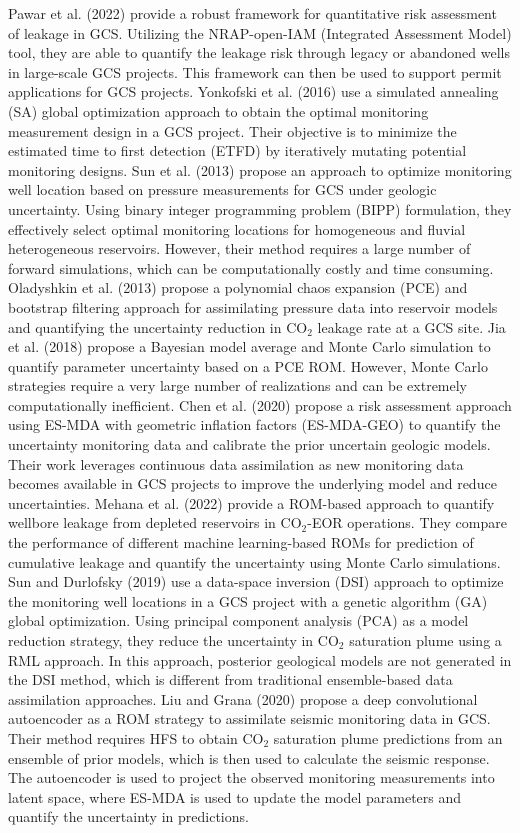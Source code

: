 \documentclass[10pt, twoside]{article}
\begin{document}
Pawar et al. (2022) provide a robust framework for quantitative risk assessment of leakage in GCS. Utilizing the NRAP-open-IAM (Integrated Assessment Model) tool, they are able to quantify the leakage risk through legacy or abandoned wells in large-scale GCS projects. This framework can then be used to support permit applications for GCS projects. Yonkofski et al. (2016) use a simulated annealing (SA) global optimization approach to obtain the optimal monitoring measurement design in a GCS project. Their objective is to minimize the estimated time to first detection (ETFD) by iteratively mutating potential monitoring designs. Sun et al. (2013) propose an approach to optimize monitoring well location based on pressure measurements for GCS under geologic uncertainty. Using binary integer programming problem (BIPP) formulation, they effectively select optimal monitoring locations for homogeneous and fluvial heterogeneous reservoirs. However, their method requires a large number of forward simulations, which can be computationally costly and time consuming. Oladyshkin et al. (2013) propose a polynomial chaos expansion (PCE) and bootstrap filtering approach for assimilating pressure data into reservoir models and quantifying the uncertainty reduction in CO$_2$ leakage rate at a GCS site. Jia et al. (2018) propose a Bayesian model average and Monte Carlo simulation to quantify parameter uncertainty based on a PCE ROM. However, Monte Carlo strategies require a very large number of realizations and can be extremely computationally inefficient. Chen et al. (2020) propose a risk assessment approach using ES-MDA with geometric inflation factors (ES-MDA-GEO) to quantify the uncertainty monitoring data and calibrate the prior uncertain geologic models. Their work leverages continuous data assimilation as new monitoring data becomes available in GCS projects to improve the underlying model and reduce uncertainties. Mehana et al. (2022) provide a ROM-based approach to quantify wellbore leakage from depleted reservoirs in CO$_2$-EOR operations. They compare the performance of different machine learning-based ROMs for prediction of cumulative leakage and quantify the uncertainty using Monte Carlo simulations. Sun and Durlofsky (2019) use a data-space inversion (DSI) approach to optimize the monitoring well locations in a GCS project with a genetic algorithm (GA) global optimization. Using principal component analysis (PCA) as a model reduction strategy, they reduce the uncertainty in CO$_2$ saturation plume using a RML approach. In this approach, posterior geological models are not generated in the DSI method, which is different from traditional ensemble-based data assimilation approaches. Liu and Grana (2020) propose a deep convolutional autoencoder as a ROM strategy to assimilate seismic monitoring data in GCS. Their method requires HFS to obtain CO$_2$ saturation plume predictions from an ensemble of prior models, which is then used to calculate the seismic response. The autoencoder is used to project the observed monitoring measurements into latent space, where ES-MDA is used to update the model parameters and quantify the uncertainty in predictions. 
\end{document}
